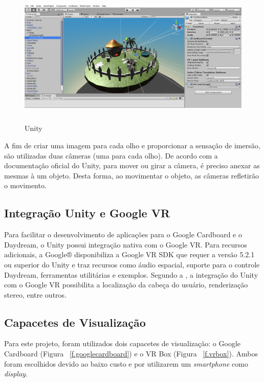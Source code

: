 \begin{figure}[H]
	\caption{\small Unity}
	\centering
	\includegraphics[height=6cm]{Imagens/unity.png}
	\label{f.unity}
\end{figure}

A fim de criar uma imagem para cada olho e proporcionar a sensação de imersão, são utilizadas duas câmeras (uma para cada olho). De acordo com a documentação oficial do Unity, para mover ou girar a câmera, é preciso anexar as mesmas à um objeto. Desta forma, ao movimentar o objeto, as câmeras refletirão o movimento. 

\subsection{Integração Unity e Google VR}
\label{ss.unitygoogle}

Para facilitar o desenvolvimento de aplicações para o Google Cardboard e o Daydream, o Unity possui integração nativa com o Google VR. Para recursos adicionais, a Google® disponibiliza a Google VR SDK que requer a versão 5.2.1 ou superior do Unity e traz recursos como áudio espacial, suporte para o controle Daydream, ferramentas utilitárias e exemplos.  Segundo a , a integração do Unity com o Google VR possibilita a localização da cabeça do usuário, renderização stereo, entre outros. 

\subsection{Capacetes de Visualização}
\label{ss.capacetes}

Para este projeto, foram utilizados dois capacetes de visualização: o Google Cardboard (Figura ~\ref{f.googlecardboard}) e o VR Box (Figura ~\ref{f.vrbox}). Ambos foram escolhidos devido ao baixo custo e por utilizarem um \textit{smartphone} como \textit{display}. 


